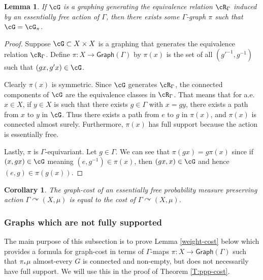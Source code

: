 \documentclass[12pt]{article}
\theoremstyle{plain}
\newtheorem{lem}[thm]{Lemma}
\newtheorem{cor}[thm]{Corollary}
\theoremstyle{definition}
\theoremstyle{remark}
\newcommand{\G}{\Gamma}
\def\cc{{\curvearrowright}}
\begin{document}
\begin{lem}
    If $\cG$ is a graphing generating the equivalence relation $\cR_\G$ induced by an essentially free action of $\G$, then there exists some $\G$-graph $\pi$ such that $\cG = \cG_\pi$. 
\end{lem}

\begin{proof}
    Suppose $\cG \subset X \times X$ is a graphing that generates the equivalence relation $\cR_\G$. Define $\pi:X \to \mathsf{Graph}(\G)$ by $\pi(x)$ is the set of all $(g'^{-1}, g^{-1})$ such that $(g x, g'x) \in \cG$.
    



    

    Clearly $\pi(x)$ is symmetric. Since $\cG$ generates $\cR_\G$, the connected components of $\cG$ are the equivalence classes in $\cR_\G$. That means that for a.e.~$x \in X$, if $y \in X$ is such that there exists $g \in \G$ with $x=g y$, there exists a path from $x$ to $y$ in $\cG$. Thus there exists a path from $e$ to $g$ in $\pi(x)$, and $\pi(x)$ is connected almost surely. Furthermore, $\pi(x)$ has full support because the action is essentially free.

    Lastly, $\pi$ is $\G$-equivariant. Let $g \in \G$. We can see that $\pi(g x) = g \pi(x)$ since if $(x, g x) \in \cG$ meaning $(e, g^{-1}) \in \pi(x)$, then $(g x, x) \in \cG$ and hence $(e, g) \in \pi(g(x))$.
\end{proof}


\begin{cor}\label{cost}
    The graph-cost of an essentially free probability measure preserving action $\Gamma \cc (X, \mu)$ is equal to the cost of $\Gamma \cc (X, \mu)$. 
\end{cor} 

\subsubsection{Graphs which are not fully supported}
The main purpose of this subsection is to prove Lemma \ref{weight-cost} below which provides a formula for graph-cost in terms of $\G$-maps $\pi: X \to \textsf{Graph}(\G)$ such that $\pi_*\mu$ almost-every $G$ is connected and non-empty, but does not necessarily have full support. We will use this in the proof of Theorem \ref{T:ppp-cost}.
\end{document}
